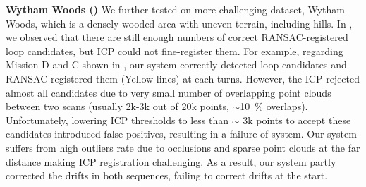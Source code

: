 \newline
\textbf{Wytham Woods (\textbf{})}\hspace{0.5em} We further tested on more challenging dataset, Wytham Woods, which is a densely wooded area with uneven terrain, including hills. In , we observed that there are still enough numbers of correct RANSAC-registered loop candidates, but ICP could not fine-register them. For example, regarding Mission D and C shown in , our system correctly detected loop candidates and RANSAC registered them (Yellow lines) at each turns. However, the ICP rejected almost all candidates due to very small number of overlapping point clouds between two scans (usually 2k-3k out of 20k points, $\sim$\SI{10}{\percent} overlaps). Unfortunately, lowering ICP thresholds to less than $\sim$ 3k points to accept these candidates introduced false positives, resulting in a failure of system. Our system suffers from high outliers rate due to occlusions and sparse point clouds at the far distance making ICP registration challenging. As a result, our system partly corrected the drifts in both sequences, failing to correct drifts at the start. 
